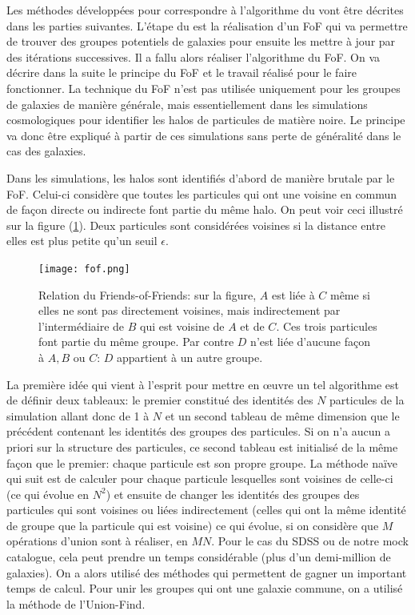 Les méthodes développées pour correspondre à l'algorithme du \citet{Yang+07} vont être décrites dans les parties suivantes.
L'étape  du \citet{Yang+07} est la réalisation d'un FoF qui va permettre de trouver des groupes potentiels de galaxies pour
ensuite les mettre à jour par des itérations successives. Il a fallu alors réaliser l'algorithme du FoF. On va décrire dans la
suite le principe du FoF et le travail réalisé pour le faire fonctionner.
La technique du FoF n'est pas utilisée uniquement pour les groupes de galaxies de manière générale, mais essentiellement dans les
simulations cosmologiques pour identifier les halos de particules de matière noire. Le principe va donc être expliqué à partir de
ces simulations sans perte de généralité dans le cas des galaxies.

Dans les simulations, les halos sont identifiés d'abord de manière brutale par le FoF. Celui-ci considère que toutes les particules
qui ont une voisine en commun de façon directe ou indirecte font partie du même halo. On peut voir ceci illustré sur la figure
(\ref{fig:fof}). Deux particules sont considérées voisines si la distance entre elles est plus petite qu'un seuil $\epsilon$.
\begin{figure}[htb]
	\centering
	\texttt{[image: fof.png]}
	\caption{\footnotesize{}Relation du Friends-of-Friends: sur la figure, $A$ est liée à $C$ même si elles
	ne sont pas directement voisines, mais indirectement par l'intermédiaire de $B$ qui est
	voisine de $A$ et de $C$. Ces trois particules font partie du même groupe. Par contre $D$
	n'est liée d'aucune façon à $A,B$ ou $C$: $D$ appartient à un autre groupe.}
	\label{fig:fof}
\end{figure}

La première idée qui vient à l'esprit pour mettre en {\oe}uvre un tel algorithme est de définir deux tableaux: le premier constitué
des identités des $N$ particules de la simulation allant donc de 1 à $N$ et un second tableau de même dimension que le précédent
contenant les identités des groupes des particules. Si on n'a aucun a priori sur la structure des particules, ce second tableau est
initialisé de la même façon que le premier: chaque particule est son propre groupe. La méthode naïve qui suit est de calculer pour
chaque particule lesquelles sont voisines de celle-ci (ce qui évolue en $N^2$) et ensuite de changer les identités des groupes des
particules qui sont voisines ou liées indirectement (celles qui ont la même identité de groupe que la particule qui est voisine) ce
qui évolue, si on considère que $M$ opérations d'union sont à réaliser, en $MN$. Pour le cas du SDSS ou de notre mock catalogue,
cela peut prendre un temps considérable (plus d'un demi-million de galaxies). On a alors utilisé des méthodes qui permettent de
gagner un important temps de calcul. Pour unir les groupes qui ont une galaxie commune, on a utilisé la méthode de l'Union-Find.

